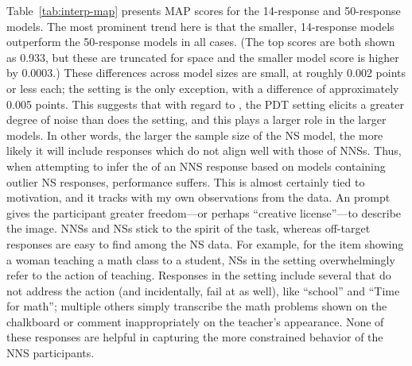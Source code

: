 Table~\ref{tab:interp-map} presents  MAP scores for the 14-response and 50-response  models. The most prominent trend here is that the smaller, 14-response models outperform the 50-response models in all cases. (The top  scores are both shown as 0.933, but these are truncated for space and the smaller model score is higher by 0.0003.) These differences across model sizes are small, at roughly 0.002 points or less each; the  setting is the only exception, with a difference of approximately 0.005 points. This suggests that with regard to , the  PDT setting elicits a greater degree of noise than does the  setting, and this plays a larger role in the larger models. In other words, the larger the sample size of the  NS model, the more likely it will include responses which do not align well with those of NNSs. Thus, when attempting to infer the  of an NNS response based on models containing outlier NS responses, performance suffers. This is almost certainly tied to motivation, and it tracks with my own observations from the data. An  prompt gives the participant greater freedom---or perhaps ``creative license''---to describe the image. NNSs and  NSs  stick to the spirit of the task, whereas off-target responses are easy to find among the  NS data. For example, for the item showing a woman teaching a math class to a student,  NSs in the  setting overwhelmingly refer to the action of teaching. Responses in the  setting include several that do not address the action (and incidentally, fail at  as well), like ``school'' and ``Time for math''; multiple others simply transcribe the math problems shown on the chalkboard or comment inappropriately on the teacher's appearance. None of these responses are helpful in capturing the more constrained behavior of the NNS participants.


